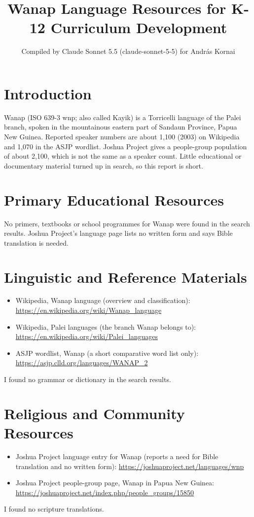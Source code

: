 \documentclass[12pt]{article}
\title{Wanap Language Resources for K-12 Curriculum Development}
\author{Compiled by Claude Sonnet 5.5 (claude-sonnet-5-5) for Andr\'as Kornai}
\date{}
\begin{document}
\maketitle

\section{Introduction}
Wanap (ISO 639-3 wnp; also called Kayik) is a Torricelli language of the Palei branch, spoken in the mountainous eastern part of Sandaun Province, Papua New Guinea. Reported speaker numbers are about 1,100 (2003) on Wikipedia and 1,070 in the ASJP wordlist. Joshua Project gives a people-group population of about 2,100, which is not the same as a speaker count. Little educational or documentary material turned up in search, so this report is short.

\section{Primary Educational Resources}
No primers, textbooks or school programmes for Wanap were found in the search results. Joshua Project's language page lists no written form and says Bible translation is needed.

\section{Linguistic and Reference Materials}
\begin{itemize}
\item Wikipedia, Wanap language (overview and classification): \url{https://en.wikipedia.org/wiki/Wanap_language}
\item Wikipedia, Palei languages (the branch Wanap belongs to): \url{https://en.wikipedia.org/wiki/Palei_languages}
\item ASJP wordlist, Wanap (a short comparative word list only): \url{https://asjp.clld.org/languages/WANAP_2}
\end{itemize}
I found no grammar or dictionary in the search results.

\section{Religious and Community Resources}
\begin{itemize}
\item Joshua Project language entry for Wanap (reports a need for Bible translation and no written form): \url{https://joshuaproject.net/languages/wnp}
\item Joshua Project people-group page, Wanap in Papua New Guinea: \url{https://joshuaproject.net/index.php/people_groups/15850}
\end{itemize}
I found no scripture translations.
\end{document}
